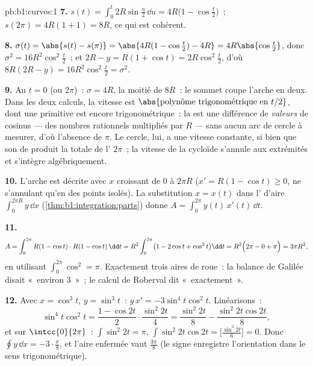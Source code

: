 \begin{solution}{pb:b1:curves:1}
\textbf{7.} $s(t) = \int_0^t 2R\sin\frac u2\,\dd u =
4R\bigl(1 - \cos\frac t2\bigr)$~; $s(2\pi) = 4R(1+1) = 8R$,
ce qui est cohérent.

\textbf{8.} $\sigma(t) = \abs{s(t) - s(\pi)} = \abs{4R(1 -
\cos\frac t2) - 4R} = 4R\abs{\cos\frac t2}$, donc $\sigma^2 =
16R^2\cos^2\frac t2$~; et $2R - y = R(1 + \cos t) =
2R\cos^2\frac t2$, d'où $8R(2R - y) = 16R^2\cos^2\frac t2 =
\sigma^2$.

\textbf{9.} Au  $t = 0$ (ou $2\pi$)~: $\sigma = 4R$, la moitié
de $8R$~: le sommet coupe l'arche en deux. Dans les deux calculs, la
vitesse est $\abs{\text{polynôme trigonométrique en } t/2}$, dont
une primitive est encore trigonométrique~: la  est une
différence de \emph{valeurs} de cosinus --- des nombres rationnels
multipliés par $R$ --- sans aucun arc de cercle à mesurer, d'où l'absence de $\pi$.
Le cercle, lui, a une vitesse constante, si bien que son  de 
produit la  totale de l' $2\pi$~; la vitesse de la cycloïde
s'annule aux extrémités et s'intègre algébriquement.

\textbf{10.} L'arche est décrite avec $x$ croissant de $0$ à
$2\pi R$ ($x' = R(1 - \cos t) \geq 0$, ne s'annulant qu'en des
points isolés). La substitution $x = x(t)$ dans l' d'aire
$\int_0^{2\pi R} y\,\dd x$ (\cref{thm:b1:integration:parts})
donne $A = \int_0^{2\pi} y(t)\,x'(t)\,\dd t$.

\textbf{11.}
\[
A = \int_0^{2\pi} R(1 - \cos t)\cdot R(1 - \cos t)\,\dd t
= R^2\int_0^{2\pi}\bigl(1 - 2\cos t + \cos^2 t\bigr)\dd t
= R^2\Bigl(2\pi - 0 + \pi\Bigr) = 3\pi R^2 ,
\]
en utilisant $\int_0^{2\pi}\cos^2 = \pi$. Exactement trois aires de roue~:
la balance de Galilée disait «~environ $3$~»~; le calcul de Roberval
dit «~exactement~».

\textbf{12.} Avec $x = \cos^3 t$, $y = \sin^3 t$~: $y\,x' =
-3\sin^4 t\cos^2 t$. Linéarisons~:
\[
\sin^4 t\cos^2 t = \frac{1 - \cos 2t}{2}\cdot\frac{\sin^2
2t}{4} = \frac{\sin^2 2t}{8} - \frac{\sin^2 2t\cos 2t}{8} ,
\]
et sur $\intcc{0}{2\pi}$~: $\int\sin^2 2t = \pi$, $\int \sin^2
2t\cos 2t = \bigl[\frac{\sin^3 2t}{6}\bigr] = 0$. Donc $\oint
y\,\dd x = -3\cdot\frac\pi8$, et l'aire enfermée vaut
$\frac{3\pi}8$ (le signe enregistre l'orientation dans le sens
trigonométrique).


\end{solution}
